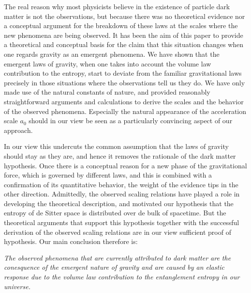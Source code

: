 \documentclass[a4paper,12pt]{article}
\begin{document}
The real reason why most physicists believe in the existence of particle dark matter  is not the observations, but because there was no theoretical evidence nor a conceptual argument for the breakdown of these laws at the scales where the new phenomena are being observed.  It has been the aim of this paper to provide a theoretical and conceptual basis for the claim that this situation changes when one regards gravity as an emergent phenomena. We have shown that the emergent laws of gravity, when one takes into account the volume law contribution to the entropy,  start to deviate from the familiar gravitational laws precisely in those situations where the observations tell us they do.  We have only made use of the natural constants of nature, and provided reasonably straightforward arguments and calculations to derive the scales and the  behavior of the observed phenomena. 
Especially the natural appearance of the acceleration scale $a_0$ should in our view be seen as a particularly convincing aspect of our approach.  

In our view this undercuts the common assumption that the laws of gravity should stay as they are, and hence it removes the rationale of the dark matter hypothesis. Once there is a conceptual reason for a new phase of the gravitational force, which is governed by different laws, and this is combined with a confirmation of its quantitative behavior, the weight of the evidence tips in the other direction. Admittedly, the observed scaling relations have played a role in developing the theoretical description, and motivated our hypothesis that the entropy of de Sitter space is distributed over de bulk of spacetime. But the theoretical arguments that support this hypothesis together with the successful derivation of the observed scaling relations are in our view sufficient proof of    hypothesis. Our main conclusion therefore is:

\begin{flushleft}
{\it The observed phenomena that are currently attributed to dark matter are the conesquence of the emergent nature of gravity and are caused by an elastic response due to the volume law contribution to the entanglement entropy in our universe.} 	
\end{flushleft}
   
\end{document}

